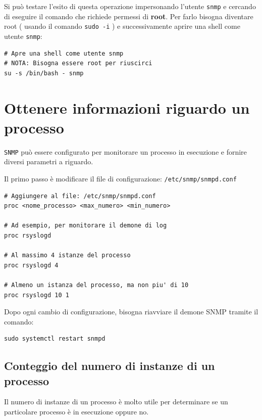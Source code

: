 \documentclass[a4paper]{report}
\newenvironment{ricordati}{\begin{tcolorbox}[fonttitle=\sffamily\bfseries\large,title=Ricordati,colframe=orange!75!white]}{\end{tcolorbox}}
\newenvironment{info}{\begin{tcolorbox}[fonttitle=\sffamily\bfseries\large,title=Info,colframe=blue!75!white]}{\end{tcolorbox}}
\newenvironment{code}{\begin{tcolorbox}[size=small]}{\end{tcolorbox}}
\begin{document}
\begin{info}
	Si può testare l'esito di questa operazione impersonando l'utente \texttt{snmp} e cercando di eseguire il comando che richiede permessi di \textbf{root}. Per farlo bisogna diventare root ( usando il comando \texttt{sudo -i} ) e successivamente aprire una shell come utente \texttt{snmp}:
	
	\begin{lstlisting}
# Apre una shell come utente snmp
# NOTA: Bisogna essere root per riuscirci
su -s /bin/bash - snmp
	\end{lstlisting}
\end{info}

\section{Ottenere informazioni riguardo un processo}

\texttt{SNMP} può essere configurato per monitorare un processo in esecuzione e fornire diversi parametri a riguardo.

Il primo passo è modificare il file di configurazione: \texttt{/etc/snmp/snmpd.conf}

\begin{code}
\begin{lstlisting}
# Aggiungere al file: /etc/snmp/snmpd.conf
proc <nome_processo> <max_numero> <min_numero>

# Ad esempio, per monitorare il demone di log
proc rsyslogd

# Al massimo 4 istanze del processo
proc rsyslogd 4

# Almeno un istanza del processo, ma non piu' di 10
proc rsyslogd 10 1
\end{lstlisting}
\end{code}

\begin{ricordati}
	Dopo ogni cambio di configurazione, bisogna riavviare il demone SNMP tramite il comando:
	\begin{lstlisting}
sudo systemctl restart snmpd
	\end{lstlisting}
\end{ricordati}

\subsection{Conteggio del numero di instanze di un processo}

Il numero di instanze di un processo è molto utile per determinare se un particolare processo è in esecuzione oppure no. 
\end{document}
